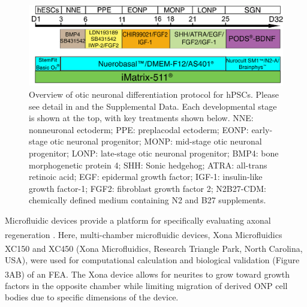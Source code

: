 \documentclass[review]{elsarticle}
\begin{document}
\begin{figure}
	\begin{center}
		\includegraphics[width=12cm]{Fig_2.jpg} %
	\end{center}
	\caption{Overview of otic neuronal differentiation protocol for hPSCs. Please see detail in \cite{Heuer2021, Chang2020,Matsuoka2017g, Matsuoka2017} and the Supplemental Data. Each developmental stage is shown at the top, with key treatments shown below. NNE: nonneuronal ectoderm; PPE: preplacodal ectoderm; EONP: early-stage otic neuronal progenitor; MONP: mid-stage otic neuronal progenitor; LONP: late-stage otic neuronal progenitor; BMP4: bone morphogenetic protein 4; SHH: Sonic hedgehog; ATRA: all-trans retinoic acid; EGF: epidermal growth factor; IGF-1: insulin-like growth factor-1; FGF2: fibroblast growth factor 2; N2B27-CDM: chemically defined medium containing N2 and B27 supplements.}
\end{figure}

Microfluidic devices provide a platform for specifically evaluating axonal regeneration \cite{Al-Ali2017a}. Here, multi-chamber microfluidic devices, Xona\textsuperscript{\texttrademark} Microfluidics XC150 and XC450 (Xona\textsuperscript{\texttrademark} Microfluidics, Research Triangle Park, North Carolina, USA), were used for computational calculation and biological validation (Figure 3A\textendash B) of an FEA. The Xona \textsuperscript{\texttrademark} device allows for neurites to grow toward growth factors in the opposite chamber while limiting migration of derived ONP cell bodies due to specific dimensions of the device. 
\end{document}

